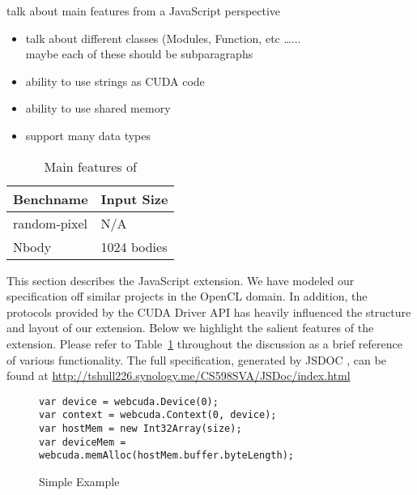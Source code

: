 

talk about main features from a JavaScript perspective
\begin{itemize}
\item talk about different classes (Modules, Function, etc \ldots...\\
maybe each of these should be subparagraphs
\item ability to use strings as CUDA code
\item ability to use shared memory
\item support many data types
\end{itemize}

\begin{table}
\begin{center}
\begin{tabular}{| l | l |}
\hline
Benchname & Input Size \\
\hline
random-pixel & N/A \\
\hline
Nbody &  1024 bodies \\
\hline
\end{tabular}
\end{center}
\caption{Main features of \name}
\label{webcudaSpec}
\end{table}

This section describes the \name JavaScript extension. We have modeled our
specification off similar projects \cite{webCL, nokiaCL, amdCL} in the OpenCL
domain.  In addition, the protocols provided by the CUDA Driver API
\cite{cudaAPI} has heavily influenced the structure and layout of our extension.
Below we highlight the salient features of the extension. Please refer to
Table~\ref{webcudaSpec} throughout the discussion as a brief reference of
various \name functionality. The full \name specification, generated by JSDOC
\cite{JSDOC}, can be found at
\url{http://tshull226.synology.me/CS598SVA/JSDoc/index.html}


\begin{figure}
	\begin{center}
\begin{lstlisting}[frame=single]
var device = webcuda.Device(0);
var context = webcuda.Context(0, device);
var hostMem = new Int32Array(size);
var deviceMem = webcuda.memAlloc(hostMem.buffer.byteLength);
\end{lstlisting}
\end{center}
\caption{Simple \name Example}
\label{codeExample}
\end{figure}

